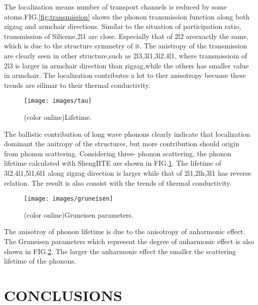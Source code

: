\documentclass[%
 reprint,
 amsmath,amssymb,
 aps,
 prb,
]{revtex4-1}
\begin{document}
The localization means number of transport channels is reduced by some atoms.FIG.\ref{fig:transmission} shows the phonon transmission function along both zigzag and armchair directions. Similar to the situation of participation ratio, transmission of Silicene,2l1 are close. Especially that of 2l2 areexactly the same, which is due to the structure symmetry of it. The anistropy of the transmission are clearly seen in other structure,such as 2l3,3l1,3l2,4l1, where transmissioin of 2l3 is larger in armchair direction than zigzag,while the others has smaller value in armchair. The localization  contributes a lot to ther anisotropy becuase these trends are silimar to their thermal conductivity.

\begin{figure}[b]
  \texttt{[image: images/tau]}
  \caption{\label{fig:tau} (color online)Lifetime.}
\end{figure}

The ballistic contribution of long wave phonons clearly indicate that localization dominant the anitropy of the structures, but more contribution should origin from phonon scattering. Considering three- phonon scattering, the phonon lifetime calculated with ShengBTE\cite{Li2014} are shown in FIG.\ref{fig:tau}. The lifetime of 3l2,4l1,5l1,6l1 along zigzag direction is larger while that of 2l1,2lh,3l1 has reverse relation. The result is also consist with the trends of thermal conductivity.

\begin{figure}[b]
  \texttt{[image: images/gruneisen]}
  \caption{\label{fig:gruneisen} (color online)Gruneisen parameters.}
\end{figure}

The anisotroy of phonon lifetime is due to the anisotropy of anharmonic effect. The Gruneisen parameters which represent the degree of anharmonic effect is also shown in FIG.\ref{fig:gruneisen}.
The larger the anharmonic effect the smaller the scattering lifetime of the phonons.



\section{CONCLUSIONS}
\end{document}
